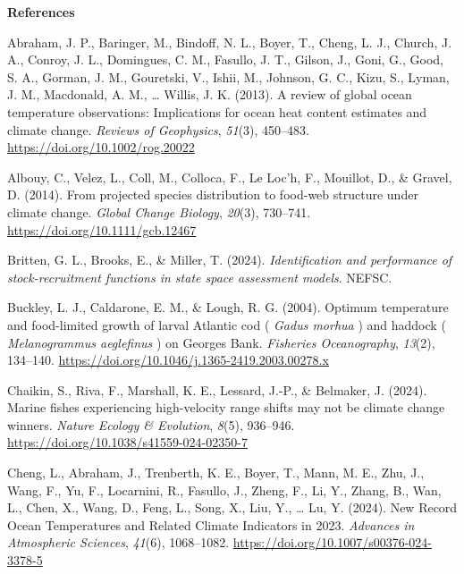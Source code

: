 \documentclass[
  12pt,
]{article}
\newlength{\cslhangindent}
\newenvironment{CSLReferences}[2] %
 {\begin{list}{}{%
  \setlength{\itemindent}{0pt}
  \setlength{\leftmargin}{0pt}
  \setlength{\parsep}{0pt}
  \ifodd #1
   \setlength{\leftmargin}{\cslhangindent}
   \setlength{\itemindent}{-1\cslhangindent}
  \fi
  \setlength{\itemsep}{#2\baselineskip}}}
 {\end{list}}
\begin{document}
\newpage

\textbf{References}

\label{refs}
\begin{CSLReferences}{1}{2}
Abraham, J. P., Baringer, M., Bindoff, N. L., Boyer, T., Cheng, L. J., Church, J. A., Conroy, J. L., Domingues, C. M., Fasullo, J. T., Gilson, J., Goni, G., Good, S. A., Gorman, J. M., Gouretski, V., Ishii, M., Johnson, G. C., Kizu, S., Lyman, J. M., Macdonald, A. M., \ldots{} Willis, J. K. (2013). A review of global ocean temperature observations: Implications for ocean heat content estimates and climate change. \emph{Reviews of Geophysics}, \emph{51}(3), 450--483. \url{https://doi.org/10.1002/rog.20022}

Albouy, C., Velez, L., Coll, M., Colloca, F., Le Loc'h, F., Mouillot, D., \& Gravel, D. (2014). From projected species distribution to food{-}web structure under climate change. \emph{Global Change Biology}, \emph{20}(3), 730--741. \url{https://doi.org/10.1111/gcb.12467}

Britten, G. L., Brooks, E., \& Miller, T. (2024). \emph{Identification and performance of stock-recruitment functions in state space assessment models}. NEFSC.

Buckley, L. J., Caldarone, E. M., \& Lough, R. G. (2004). Optimum temperature and food{-}limited growth of larval Atlantic cod ( {\emph{Gadus morhua}} ) and haddock ( {\emph{Melanogrammus aeglefinus}} ) on Georges Bank. \emph{Fisheries Oceanography}, \emph{13}(2), 134--140. \url{https://doi.org/10.1046/j.1365-2419.2003.00278.x}

Chaikin, S., Riva, F., Marshall, K. E., Lessard, J.-P., \& Belmaker, J. (2024). Marine fishes experiencing high-velocity range shifts may not be climate change winners. \emph{Nature Ecology \& Evolution}, \emph{8}(5), 936--946. \url{https://doi.org/10.1038/s41559-024-02350-7}

Cheng, L., Abraham, J., Trenberth, K. E., Boyer, T., Mann, M. E., Zhu, J., Wang, F., Yu, F., Locarnini, R., Fasullo, J., Zheng, F., Li, Y., Zhang, B., Wan, L., Chen, X., Wang, D., Feng, L., Song, X., Liu, Y., \ldots{} Lu, Y. (2024). New Record Ocean Temperatures and Related Climate Indicators in 2023. \emph{Advances in Atmospheric Sciences}, \emph{41}(6), 1068--1082. \url{https://doi.org/10.1007/s00376-024-3378-5}


\end{CSLReferences}
\end{document}
